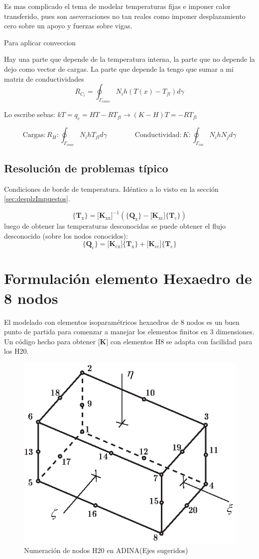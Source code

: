 \documentclass[11pt, a4paper,titlepage]{article}
\newcommand{\Adina}{{\sc ADINA}}
\newcommand{\Mme}[1]{\boldsymbol{[}\mathbf{#1} \boldsymbol{]}}
\newcommand{\Cme}[1]{\boldsymbol{\{ }\mathbf{#1} \boldsymbol{\}} }
\newcommand{\MK}{\Mme{K}}
\begin{document}
Es mas complicado el tema de modelar temperaturas fijas e imponer calor transferido, pues son aseveraciones no tan reales como imponer desplazamiento cero sobre un apoyo y  fuerzas sobre vigas.

Para aplicar conveccion 

Hay una parte que depende de la temperatura interna, la parte que no depende la dejo como vector de cargas. La parte que depende la tengo que sumar a mi matriz de conductividades
\[
R_{C_{i}}=\oint_{\Gamma_{c o m v}} N_{i} h\left(T(x)-T_{f l}\right) d \gamma
\]

Lo escribe sebas: $kT=q_c = HT-RT_{fl} \longrightarrow (K-H)T = -R T_{fl}$

\[
\mathrm{Cargas:} R_{H} : \oint_{\Gamma_{c o n v}} N_{i} h T_{f l} d \gamma \qquad \qquad \mathrm{Conductividad:}  K : \oint_{\Gamma_{c m}} N_{i} h N_{j} d \gamma
\]


\subsection*{Resolución de problemas típico}

Condiciones de borde de temperatura. Idéntico a lo visto en la sección \ref{sec:desplzImpuestos}.

\[
\Cme{T_{\mathrm{x}}} = \Mme{K_{\mathrm{xx}}}^{-1} \left( \Cme{Q_\mathrm{x}}- \Mme{K_{\mathrm{xc}}}  \Cme{T_\mathrm{c}} \right)
\]
luego de obtener las temperaturas desconocidas se puede obtener el flujo desconocido (sobre los nodos conocidos):
\[
\Cme{Q_{\mathrm{c}}} = \Mme{K_{\mathrm{cx}}} \Cme{T_\mathrm{x}} + \Mme{K_{\mathrm{cc}}} \Cme{T_\mathrm{c}}  
\]





\section{Formulación elemento Hexaedro de 8 nodos}
\newcommand{\dof}{\ensuremath{\mathrm{dof}}}
El modelado con elementos isoparamétricos hexaedros de 8 nodos es un buen punto de partida para comenzar a manejar los elementos finitos en 3 dimensiones. Un código hecho para obtener $\MK$ con elementos H8 se adapta con facilidad para los H20.

\begin{figure}[htb!]
	\centering
	\includegraphics[width=.6\textwidth]{fig/H20numbering.eps}
	\caption{Numeración de nodos H20 en \Adina (Ejes sugeridos)}
	\label{fig:H20numbering}
\end{figure}
\end{document}
